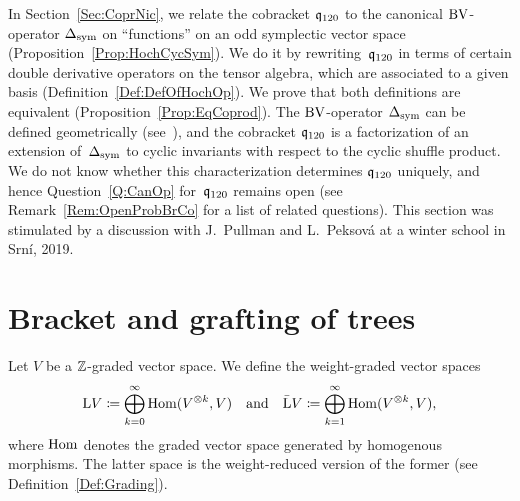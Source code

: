 \documentclass[\MainFolder/Text.tex]{subfiles}
\begin{document}
In Section~\ref{Sec:CoprNic}, we relate the cobracket $\mathfrak{q}_{120}$ to the canonical $\mathrm{BV}$-operator $\operatorname{\Delta}_{\mathrm{sym}}$ on ``functions'' on an odd symplectic vector space (Proposition~\ref{Prop:HochCycSym}). We do it by rewriting~$\mathfrak{q}_{120}$ in terms of certain double derivative operators on the tensor algebra, which are associated to a given basis (Definition~\ref{Def:DefOfHochOp}). We prove that both definitions are equivalent (Proposition~\ref{Prop:EqCoprod}). The $\mathrm{BV}$-operator $\operatorname{\Delta}_{\mathrm{sym}}$ can be defined geometrically (see~\cite{Doubek2018}), and the cobracket $\mathfrak{q}_{120}$ is a factorization of an extension of~$\operatorname{\Delta}_{\mathrm{sym}}$ to cyclic invariants with respect to the cyclic shuffle product. We do not know whether this characterization determines $\mathfrak{q}_{120}$ uniquely, and hence Question~\ref{Q:CanOp} for~$\mathfrak{q}_{120}$ remains open (see Remark~\ref{Rem:OpenProbBrCo} for a list of related questions). This section was stimulated by a discussion with J.~Pullman and L.~Peksov\'a at a winter school in Srn\'i, 2019.%

\section{Bracket and grafting of trees}\label{Sec:LieBrHoch}

Let $V$ be a $\mathbb{Z}$-graded vector space. We define the weight-graded vector spaces
\begin{equation}\label{Eq:DefOfD}
\mathrm{L} V \coloneqq \bigoplus_{k=0}^\infty \mathrm{Hom}(V^{\otimes k},V)\quad\text{and}\quad \bar{\mathrm{L}} V \coloneqq \bigoplus_{k=1}^\infty \mathrm{Hom}(V^{\otimes k},V),
\end{equation}
where $\mathrm{Hom}$ denotes the graded vector space generated by homogenous morphisms. The latter space is the weight-reduced version of the former (see Definition~\ref{Def:Grading}).
\end{document}
